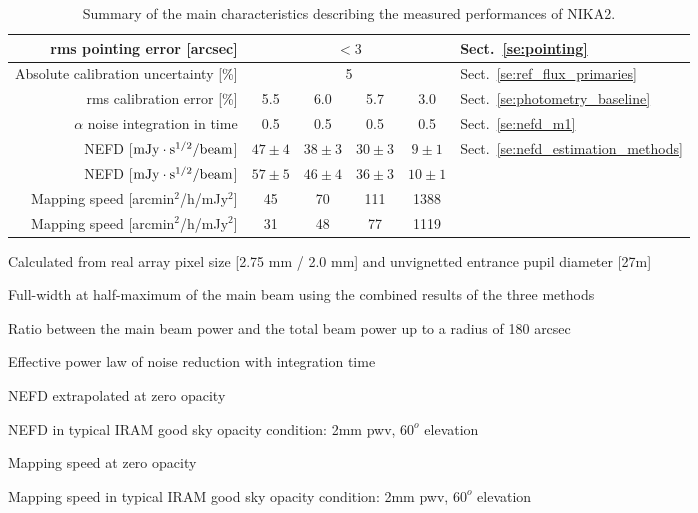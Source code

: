 \begin{table}[h]
\begin{center}
\begin{threeparttable}
\begin{tabular}{|r|c|c|c|c|l|}
      \hline
      rms pointing error    [arcsec]             & \multicolumn{4}{|c|}{$<3$} &  Sect.~\ref{se:pointing} \\
      \hline
      Absolute calibration uncertainty [\%]      &  \multicolumn{4}{|c|}{5}   & Sect.~\ref{se:ref_flux_primaries} \\
      \hline
      rms calibration error [\%]                 &    5.5       &     6.0       &      5.7       &     3.0       & Sect.~\ref{se:photometry_baseline} \\
      \hline
      $\alpha$ noise integration in time\tnote{(d)}\hspace{3mm}  & 0.5  & 0.5  &  0.5 & 0.5 & Sect.~\ref{se:nefd_m1} \\
      \hline
      NEFD\tnote{(e)}\hspace{3mm} [$\rm{mJy} \cdot \rm{s}^{1/2}/\rm{beam}$]  & $47 \pm 4$ & $38 \pm 3$  & $30 \pm 3$  & $9 \pm 1$ & Sect.~\ref{se:nefd_estimation_methods}\\
      NEFD\tnote{(f)}\hspace{3mm} [$\rm{mJy} \cdot \rm{s}^{1/2}/\rm{beam}$]  & $57 \pm 5$ & $46 \pm 4$  & $36 \pm 3$  & $10 \pm 1$ & \\
      Mapping speed\tnote{(g)}\hspace{3mm} [arcmin$^2$/h/mJy$^2$] & 45  & 70  & 111  &  1388 &  \\
      Mapping speed\tnote{(h)}\hspace{3mm} [arcmin$^2$/h/mJy$^2$] & 31  & 48  &  77  &  1119 &  \\
\hline

\end{tabular}
  \begin{tablenotes}
{\small     
  \item[(a)] Calculated from real array pixel size [2.75 mm / 2.0 mm] and unvignetted entrance pupil diameter [27m]
  \item[(b)] Full-width at half-maximum of the main beam using the combined results of the three methods
  \item[(c)] Ratio between the main beam power and the total beam power up to a radius of 180 arcsec
  \item[(d)] Effective power law of noise reduction with integration time
  \item[(e)] NEFD extrapolated at zero opacity
  \item[(f)] NEFD in typical IRAM good sky opacity condition: 2mm pwv, $60^o$ elevation
  \item[(g)] Mapping speed at zero opacity
  \item[(h)] Mapping speed in typical IRAM good sky opacity condition: 2mm pwv, $60^o$ elevation
}
  \end{tablenotes}
\end{threeparttable}
\caption[Main performance measurements]{Summary of the main characteristics describing the measured 
performances of NIKA2.}
\label{tab:nika2summary}
\end{center}  
\end{table}


